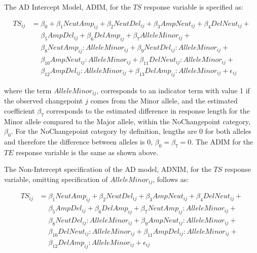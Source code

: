 The AD Intercept Model, ADIM, for the $TS$ response variable is specified as: 

\begin{equation}
\begin{aligned}
TS_{ij}&=\beta_0+ \beta_1 NeutAmp_{ij} + \beta_2NeutDel_{ij}+ \beta_3{AmpNeut_{ij}} + \beta_4DelNeut_{ij} +  \\
       & \mathrel{\phantom{=}} \beta_5AmpDel_{ij} + \beta_6DelAmp_{ij} + \beta_7AlleleMinor_{ij} + \\ & \mathrel{\phantom{=}} \beta_8 NeutAmp_{ij}:AlleleMinor_{ij} + \beta_9NeutDel_{ij}:AlleleMinor_{ij}+  \\ & \mathrel{\phantom{=}} \beta_{10}{AmpNeut_{ij}}:AlleleMinor_{ij} + \beta_{11}DelNeut_{ij}:AlleleMinor_{ij} + \\ & \mathrel{\phantom{=}} \beta_{12}AmpDel_{ij}:AlleleMinor_{ij} + \beta_{13}DelAmp_{ij}:AlleleMinor_{ij} + \epsilon_{ij}
\end{aligned}
\label{Model2}
\end{equation}

where the term $AlleleMinor_{ij}$, corresponds to an indicator term with value 1 if the observed changepoint ${j}$ comes from the Minor allele, and the estimated coefficient $\beta_7$ corresponds to the estimated difference in response length for the Minor allele compared to the Major allele, within the NoChangepoint category, $\beta_0$. For the NoChangepoint category by definition, lengths are 0 for both alleles and therefore the difference between alleles is 0, $\beta_0=\beta_7=0$. The ADIM for the $TE$ response variable is the same as shown above.

The Non-Intercept specification of the AD model, ADNIM, for the $TS$ response variable, omitting specification of $AlleleMinor_{ij}$, follows as: 

\begin{equation}
\begin{aligned}
TS_{ij}&= \beta_1 NeutAmp_{ij} + \beta_2NeutDel_{ij}+ \beta_3{AmpNeut_{ij}} + \beta_4DelNeut_{ij} +  \\
       & \mathrel{\phantom{=}} \beta_5AmpDel_{ij} + \beta_6DelAmp_{ij} + \beta_7 NeutAmp_{ij}:AlleleMinor_{ij} + \\ & \mathrel{\phantom{=}} \beta_8NeutDel_{ij}:AlleleMinor_{ij}+  \beta_{9}{AmpNeut_{ij}}:AlleleMinor_{ij} + \\ & \mathrel{\phantom{=}} \beta_{10}DelNeut_{ij}:AlleleMinor_{ij} + \beta_{11}AmpDel_{ij}:AlleleMinor_{ij} + \\ & \mathrel{\phantom{=}}\beta_{12}DelAmp_{ij}:AlleleMinor_{ij} + \epsilon_{ij}
\end{aligned}
\label{Model3}
\end{equation}

